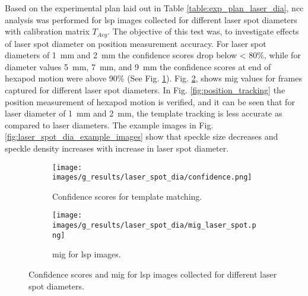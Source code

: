     Based on the experimental plan laid out in Table \ref{table:exp_plan_laser_dia}, \gls{ncc} analysis was performed for \gls{lsp} images collected for different laser spot diameters with calibration matrix $T_{Avg}$. The objective of this test was, to investigate effects of laser spot diameter on position measurement accuracy. For laser spot diameters of \SI{1}{\milli\meter} and \SI{2}{\milli\meter} the confidence scores drop below < 80\%, while for diameter values \SI{5}{\milli\meter}, \SI{7}{\milli\meter}, and \SI{9}{\milli\meter} the confidence scores at end of hexapod motion were above 90\% (See Fig. \ref{subfig:laser_spot_dia/confidence.png}). Fig. \ref{subfig:laser_spot_dia/mig_laser_spot.png}, shows \gls{mig} values for frames captured for different laser spot diameters. In Fig. \ref{fig:position_tracking} the position measurement of hexapod motion is verified, and it can be seen that for laser diameter of \SI{1}{\milli\meter} and \SI{2}{\milli\meter}, the template tracking is less accurate as compared to laser diameters. The example images in Fig. \ref{fig:laser_spot_dia_example_images} show that speckle size decreases and speckle density increases with increase in laser spot diameter.

    \begin{figure}[ht]
        \centering
        \begin{subfigure}[b]{0.65\textwidth}
            \centering
            \texttt{[image: images/g\_results/laser\_spot\_dia/confidence.png]}
            \caption{Confidence scores for template matching.}
            \label{subfig:laser_spot_dia/confidence.png}
        \end{subfigure}

        \vspace{3mm}
        
        \begin{subfigure}[b]{0.65\textwidth}
            \centering
            \texttt{[image: images/g\_results/laser\_spot\_dia/mig\_laser\_spot.png]}
            \caption{\gls{mig} for \gls{lsp} images.}
            \label{subfig:laser_spot_dia/mig_laser_spot.png}
        \end{subfigure} 
        \caption{Confidence scores and \gls{mig} for \gls{lsp} images collected for different laser spot diameters.}
        \label{fig:laser_spot_dia_results}
    \end{figure}
    
